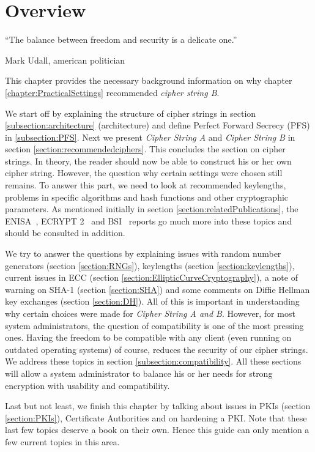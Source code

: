 \section{Overview}
\label{sec:TheoryOverview}


\epigraph{``The balance between freedom and security is a delicate one.''}{Mark Udall, american politician}

This chapter provides the necessary background information on why chapter \ref{chapter:PracticalSettings} recommended \textit{cipher string B}.

We start off by explaining the structure of cipher strings in section \ref{subsection:architecture} (architecture) and define Perfect Forward Secrecy (PFS) in \ref{subsection:PFS}. Next we present \textit{Cipher String A} and \textit{Cipher String B} in section \ref{section:recommendedciphers}. This concludes the section on cipher strings. In theory, the reader should now be able to construct his or her own cipher string. However, the question why certain settings were chosen still remains. To answer this part, we need to look at recommended keylengths, problems in specific algorithms and hash functions and other cryptographic parameters. As mentioned initially in section \ref{section:relatedPublications}, the ENISA~\cite{ENISA2013}, ECRYPT 2~\cite{ii2011ecrypt} and BSI~\cite{TR02102} reports go much more into these topics and should be consulted in addition.

We try to answer the questions by explaining issues with random number generators (section \ref{section:RNGs}), keylengths (section \ref{section:keylengths}), current issues in ECC (section \ref{section:EllipticCurveCryptography}), a note of warning on SHA-1 (section \ref{section:SHA}) and some comments on Diffie Hellman key exchanges (section \ref{section:DH}). All of this is important in understanding why certain choices were made for \textit{Cipher String A and B}. However, for most system administrators, the question of compatibility is one of the most pressing ones.  Having the freedom to be compatible with any client (even running on outdated operating systems) of course, reduces the security of our cipher strings. We address these topics in section \ref{subsection:compatibility}. All these sections will allow a system administrator to balance his or her needs for strong encryption with usability and compatibility.

Last but not least, we finish this chapter by talking about issues in PKIs (section \ref{section:PKIs}), Certificate Authorities and on hardening a PKI.  Note that these last few topics deserve a book on their own. Hence this guide can only mention a few current topics in this area.

